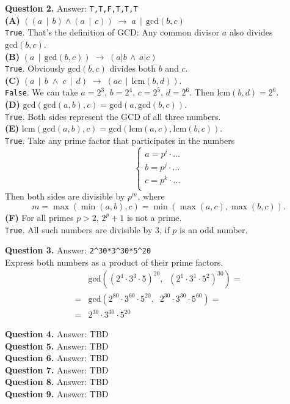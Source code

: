 \documentclass[jou]{apa6}
\begin{document}
\vspace{6pt}
{\bf Question 2.} Answer: {\tt T,T,F,T,T,T}\\
{\bf (A)} $((a\,\mid\,b) \wedge (a\,\mid\,c)) \;\rightarrow\; a\,\mid\,\text{gcd}(b,c)$\\
{\tt True}. That's the definition of GCD: Any common divisor $a$ also divides $\text{gcd}(b,c)$.\\
{\bf (B)} $(a\,\mid\,\text{gcd}(b,c)) \;\rightarrow\; (a|b\,\wedge\,a|c)$\\
{\tt True}. Obviously $\text{gcd}(b,c)$ divides both $b$ and $c$.\\
{\bf (C)} $(a\,\mid\,b\;\wedge\;c\,\mid\,d) \;\rightarrow\; (ac\,\mid\,\text{lcm}(b,d))$.\\
{\tt False}. We can take $a = 2^3$, $b = 2^4$, $c = 2^5$, $d = 2^6$. Then $\text{lcm}(b,d) = 2^6$.\\
{\bf (D)} $\text{gcd}(\text{gcd}(a,b),c) = \text{gcd}(a,\text{gcd}(b,c))$.\\
{\tt True}. Both sides represent the GCD of all three numbers.\\
{\bf (E)} $\text{lcm}(\text{gcd}(a,b),c) = \text{gcd}(\text{lcm}(a,c), \text{lcm}(b,c))$.\\
{\tt True}. Take any prime factor that participates in the numbers 
$$\left\{ \begin{array}{l}
a = p^i \cdot \ldots \\
b = p^j \cdot \ldots \\
c = p^k \cdot \ldots \\
\end{array} \right.$$
Then both sides are divisible by $p^m$, where 
$$m = \max(\min(a,b),c) = \min(\max(a,c),\max(b,c)).$$
{\bf (F)} For all primes $p>2$, $2^p +1$ is not a prime.\\
{\tt True}. All such numbers are divisible by $3$, if $p$ is an odd number.


\vspace{6pt}
{\bf Question 3.} Answer: {\tt 2\^{}30*3\^{}30*5\^{}20}\\
Express both numbers as a product of their prime factors. 
\begin{align}
 & \text{gcd}\left( (2^4 \cdot 3^3 \cdot 5)^{20},\;\; (2^1 \cdot 3^1 \cdot 5^2)^{30} \right) = \nonumber \\
= & \text{gcd}\left( 2^{80} \cdot 3^{60} \cdot 5^{20},\;\; 2^{30} \cdot 3^{30} \cdot 5^{60} \right) = \nonumber \\
= & 2^{30} \cdot  3^{30} \cdot 5^{20} \nonumber
\end{align}


\vspace{6pt}
{\bf Question 4.} Answer: TBD\\

\vspace{6pt}
{\bf Question 5.} Answer: TBD\\

\vspace{6pt}
{\bf Question 6.} Answer: TBD\\

\vspace{6pt}
{\bf Question 7.} Answer: TBD\\

\vspace{6pt}
{\bf Question 8.} Answer: TBD\\

\vspace{6pt}
{\bf Question 9.} Answer: TBD\\
\end{document}

